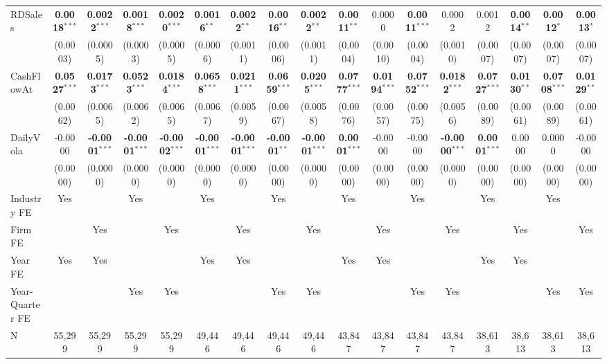 \begin{landscape}
\begin{table}[H]
\begin{tabular}{lcccccccccccccccc}
RDSales & \textbf{0.0018}$^{***}$ & \textbf{0.0022}$^{***}$ & \textbf{0.0018}$^{***}$ & \textbf{0.0020}$^{***}$ & \textbf{0.0016}$^{**}$ & \textbf{0.0022}$^{**}$ & \textbf{0.0016}$^{**}$ & \textbf{0.0022}$^{**}$ & \textbf{0.0011}$^{**}$ & 0.0000 & \textbf{0.0011}$^{***}$ & 0.0002 & 0.0012 & \textbf{0.0014}$^{**}$ & \textbf{0.0012}$^{*}$ & \textbf{0.0013}$^{*}$ \\
 & (0.0003) & (0.0005) & (0.0003) & (0.0005) & (0.0006) & (0.0011) & (0.0006) & (0.0011) & (0.0004) & (0.0010) & (0.0004) & (0.0010) & (0.0007) & (0.0007) & (0.0007) & (0.0007) \\
CashFlowAt & \textbf{0.0527}$^{***}$ & \textbf{0.0173}$^{***}$ & \textbf{0.0523}$^{***}$ & \textbf{0.0184}$^{***}$ & \textbf{0.0658}$^{***}$ & \textbf{0.0211}$^{***}$ & \textbf{0.0659}$^{***}$ & \textbf{0.0205}$^{***}$ & \textbf{0.0777}$^{***}$ & \textbf{0.0194}$^{***}$ & \textbf{0.0752}$^{***}$ & \textbf{0.0182}$^{***}$ & \textbf{0.0727}$^{***}$ & \textbf{0.0130}$^{**}$ & \textbf{0.0708}$^{***}$ & \textbf{0.0129}$^{**}$ \\
 & (0.0062) & (0.0065) & (0.0062) & (0.0065) & (0.0067) & (0.0059) & (0.0067) & (0.0058) & (0.0076) & (0.0057) & (0.0075) & (0.0056) & (0.0089) & (0.0061) & (0.0089) & (0.0061) \\
DailyVola & -0.0000 & \textbf{-0.0001}$^{***}$ & \textbf{-0.0001}$^{***}$ & \textbf{-0.0002}$^{***}$ & \textbf{-0.0001}$^{***}$ & \textbf{-0.0001}$^{***}$ & \textbf{-0.0001}$^{**}$ & \textbf{-0.0001}$^{***}$ & \textbf{0.0001}$^{***}$ & -0.0000 & -0.0000 & \textbf{-0.0000}$^{***}$ & \textbf{0.0001}$^{***}$ & 0.0000 & 0.0000 & -0.0000 \\
 & (0.0000) & (0.0000) & (0.0000) & (0.0000) & (0.0000) & (0.0000) & (0.0000) & (0.0000) & (0.0000) & (0.0000) & (0.0000) & (0.0000) & (0.0000) & (0.0000) & (0.0000) & (0.0000) \\
\midrule
Industry FE & Yes &  & Yes &  & Yes &  & Yes &  & Yes &  & Yes &  & Yes &  & Yes &  \\
Firm FE &  & Yes &  & Yes &  & Yes &  & Yes &  & Yes &  & Yes &  & Yes &  & Yes \\
Year FE & Yes & Yes &  &  & Yes & Yes &  &  & Yes & Yes &  &  & Yes & Yes &  &  \\
Year-Quarter FE &  &  & Yes & Yes &  &  & Yes & Yes &  &  & Yes & Yes &  &  & Yes & Yes \\
\midrule
N & 55,299 & 55,299 & 55,299 & 55,299 & 49,446 & 49,446 & 49,446 & 49,446 & 43,847 & 43,847 & 43,847 & 43,847 & 38,613 & 38,613 & 38,613 & 38,613 \\

\end{tabular}
\end{table}
\end{landscape}
